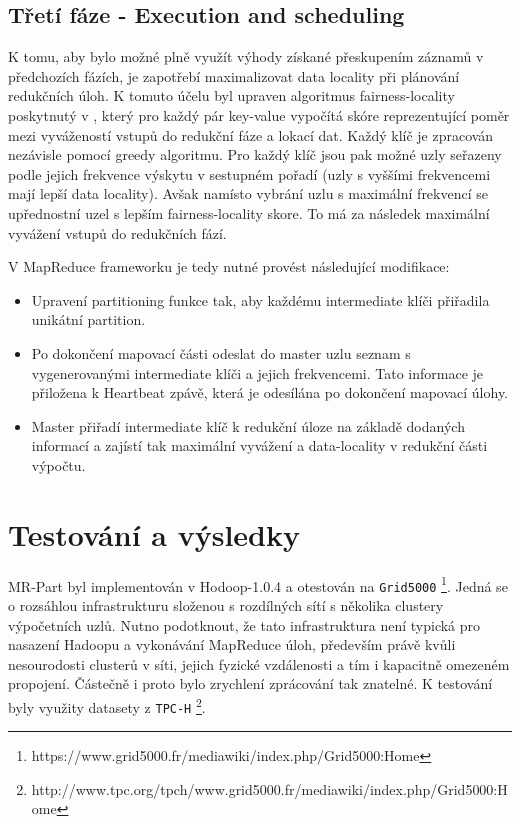 \documentclass[thesis=M,czech]{FITthesis}[2012/06/26]
\begin{document}
\subsection{Třetí fáze - Execution and scheduling}
K tomu, aby bylo možné plně využít výhody získané přeskupením záznamů v předchozích fázích, je zapotřebí maximalizovat data locality při plánování redukčních úloh. K tomuto účelu byl upraven algoritmus fairness-locality poskytnutý v \cite{cloudcom}, který pro každý pár key-value vypočítá skóre reprezentující poměr mezi vyvážeností vstupů do redukční fáze a lokací dat. Každý klíč je zpracován nezávisle pomocí greedy algoritmu. Pro každý klíč jsou pak možné uzly seřazeny podle jejich frekvence výskytu v sestupném pořadí (uzly s vyššími frekvencemi mají lepší data locality). Avšak namísto vybrání uzlu s maximální frekvencí se upřednostní uzel s lepším fairness-locality skore. To má za následek maximální vyvážení vstupů do redukčních fází.

V MapReduce frameworku je tedy nutné provést následující modifikace:

\begin{itemize}
  \item Upravení partitioning funkce tak, aby každému intermediate klíči přiřadila unikátní partition.
  \item Po dokončení mapovací části odeslat do master uzlu seznam s vygenerovanými intermediate klíči a jejich frekvencemi. Tato informace je přiložena k Heartbeat zpávě, která je odesílána po dokončení mapovací úlohy.
  \item Master přiřadí  intermediate klíč k redukční úloze na základě dodaných informací a zajístí tak maximální vyvážení a data-locality v redukční části výpočtu.
\end{itemize} 

\section{Testování a výsledky}
MR-Part byl implementován v Hodoop-1.0.4 a otestován na \texttt{Grid5000} \footnote{https://www.grid5000.fr/mediawiki/index.php/Grid5000:Home}. Jedná se o  rozsáhlou infrastrukturu složenou s rozdílných sítí s několika clustery výpočetních uzlů. Nutno podotknout, že tato infrastruktura není typická pro nasazení Hadoopu a vykonávání MapReduce úloh, především právě  kvůli nesourodosti clusterů v síti, jejich fyzické vzdálenosti a tím i kapacitně omezeném propojení. Částečně i proto bylo zrychlení zprácování tak znatelné. K testování byly využity datasety z \texttt{TPC-H} \footnote{http://www.tpc.org/tpch/www.grid5000.fr/mediawiki/index.php/Grid5000:Home}. 
\end{document}
